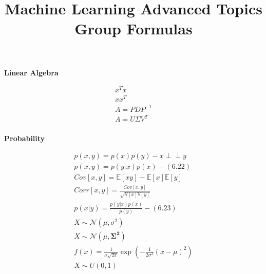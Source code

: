\documentclass[11pt]{article}
\date{} %
\title{Machine Learning Advanced Topics Group Formulas \vspace{-4em}}
\newcommand{\indep}{\perp \!\!\! \perp}
\begin{document}
\maketitle



\noindent
\begin{minipage}[t]{0.333\textwidth}

\textbf{Linear Algebra}

\begin{equation*}
\begin{split}
	x^Tx\\
	xx^T\\
	A = P D P^{-1}\\
	A = U\Sigma V^T\\
\end{split}	
\end{equation*}

\textbf{Probability}
\begin{center}
\begin{equation*}
\begin{split}
	p(x,y) = p(x)p(y) -  x \indep y\\
	p(x,y) = p(y|x)p(x) - (6.22)\\
Cov[x,y] = \mathbb{E}[xy]-\mathbb{E}[x]\mathbb{E}[y]\\
Corr[x,y] = \frac{Cov[x,y]}{\sqrt{\mathbb{V}[x] \mathbb{V}[y]}}\\
	p(x|y) = \frac{p(y|x)p(x)}{p(y)} - (6.23)\\
X\sim \mathcal{N}(\mu,\sigma^2)\\
X\sim \mathcal{N}(\mu, \boldsymbol{\Sigma^2})\\
f(x) = \frac{1}{\sigma\sqrt{2\pi}}\exp(-\frac{1}{2\sigma^2}(x-\mu)^2) \\
X \sim U(0, 1)\\
\end{split}		
\end{equation*}
\end{center}

\end{minipage}%
\end{document}
